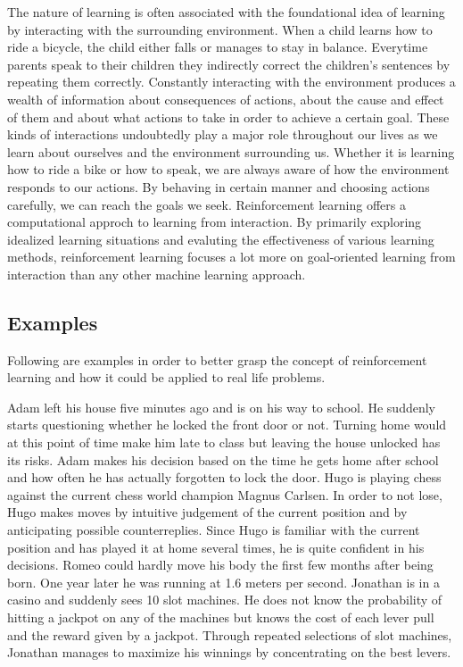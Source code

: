 \documentclass[titlepage]{article}
\begin{document}
\vskip 0.3cm

The nature of learning is often associated with the foundational idea of learning by interacting with the surrounding environment. When a child learns how to ride a bicycle, the child either falls or manages to stay in balance. Everytime parents speak to their children they indirectly correct the children's sentences by repeating them correctly. Constantly interacting with the environment produces a wealth of information about consequences of actions, about the cause and effect of them and about what actions to take in order to achieve a certain goal. These kinds of interactions undoubtedly play a major role throughout our lives as we learn about ourselves and the environment surrounding us. Whether it is learning how to ride a bike or how to speak, we are always aware of how the environment responds to our actions. By behaving in certain manner and choosing actions carefully, we can reach the goals we seek. Reinforcement learning \cite{sutton} offers a computational approch to learning from interaction. By primarily exploring idealized learning situations and evaluting the effectiveness of various learning methods, reinforcement learning focuses a lot more on goal-oriented learning from interaction than any other machine learning approach. 

\subsection{Examples}

\vskip 0.3cm

Following are examples in order to better grasp the concept of reinforcement learning and how it could be applied to real life problems.

\vskip 0.3cm

\begin{outline}
    \1 Adam left his house five minutes ago and is on his way to school. He suddenly starts questioning whether he locked the front door or not. Turning home would at this point of time make him late to class but leaving the house unlocked has its risks. Adam makes his decision based on the time he gets home after school and how often he has actually forgotten to lock the door. 
    \1 Hugo is playing chess against the current chess world champion Magnus Carlsen. In order to not lose, Hugo makes moves by intuitive judgement of the current position and by anticipating possible counterreplies. Since Hugo is familiar with the current position and has played it at home several times, he is quite confident in his decisions. 
    \1 Romeo could hardly move his body the first few months after being born. One year later he was running at 1.6 meters per second.
    \1 Jonathan is in a casino and suddenly sees 10 slot machines. He does not know the probability of hitting a jackpot on any of the machines but knows the cost of each lever pull and the reward given by a jackpot. Through repeated selections of slot machines, Jonathan manages to maximize his winnings by concentrating on the best levers. 
\end{outline}
\end{document}
